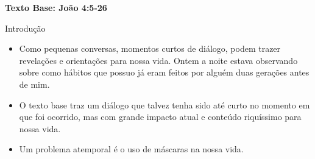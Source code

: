 \documentclass[12pt, legalpaper]{article}
\begin{document}
\textbf{Texto Base: João 4:5-26}


















\begin{large}Introdução\end{large}

\begin{itemize}
   \item Como pequenas conversas, momentos curtos de diálogo, podem trazer revelações e orientações para nossa vida. Ontem a noite estava observando sobre como hábitos que possuo já eram feitos por alguém duas gerações antes de mim.
  
   \item O texto base traz um diálogo que talvez tenha sido até curto no momento em que foi ocorrido, mas com grande impacto atual e conteúdo riquíssimo para nossa vida.

   \item Um problema atemporal é o uso de máscaras na nossa vida.

\end{itemize}
\end{document}
